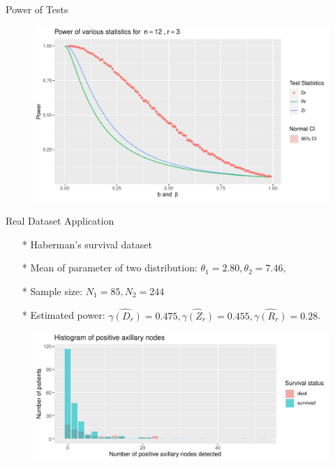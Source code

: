\documentclass{beamer}
\theoremstyle{definition}
\theoremstyle{remark}
\begin{document}

\begin{frame}{Power of Tests}
    \begin{figure}
        \includegraphics[scale = 0.5]{plot_5.pdf}
    \end{figure}
\end{frame}
\begin{frame}{Real Dataset Application }
    \begin{itemize}
        \item[*] Haberman’s survival dataset
        \item[*] Mean of parameter of two distribution: $\theta_1 = 2.80 , \theta_2 = 7.46,$
        \item[*] Sample size: $N_1 = 85, N_2 = 244$
        \item[*] Estimated power: $\hat{\gamma(D_r)} = 0.475, \hat{\gamma(Z_r)} = 0.455, \hat{\gamma(R_r)} = 0.28$.   
    \end{itemize}
    \begin{figure}
        \includegraphics[scale = 0.5]{plot_cancer.pdf}
    \end{figure}
\end{frame}



\end{document}
